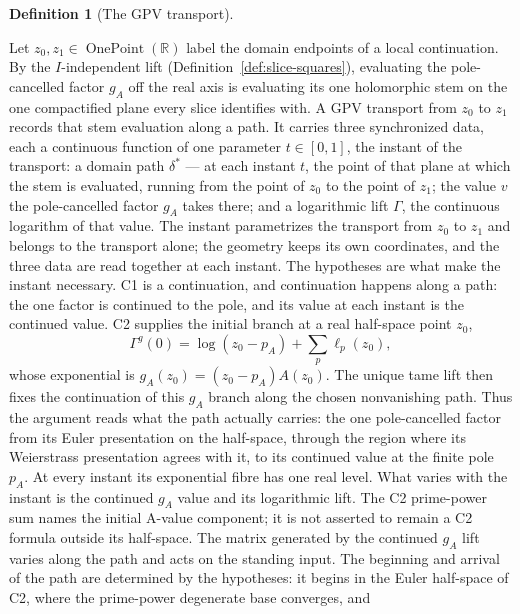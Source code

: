 \documentclass[11pt]{article}
\newcommand{\RR}{\mathbb{R}}
\providecommand{\lean}[1]{}
\providecommand{\uses}[1]{}
\theoremstyle{plain}
\theoremstyle{definition}
\newtheorem{definition}[theorem]{Definition}
\theoremstyle{remark}
\begin{document}
\begin{definition}[The GPV transport]\label{def:gpv-transport}
\lean{ASection.GpvTransport, ASection.GpvCircuit,
ASection.GpvCircuit.ofEulerHalfSpaceLoop, ASection.pole_re_le_Ω₀,
ASection.exists_euler_to_pole_with_initial}
\uses{thm:winding-lift, prop:winding-signature, def:A-section}
Let $z_0,z_1\in\operatorname{OnePoint}(\RR)$ label the domain endpoints
of a local continuation. By the $I$-independent lift
(Definition~\ref{def:slice-squares}), evaluating the pole-cancelled factor
$g_A$ off the real axis is evaluating its one holomorphic stem on the one
compactified plane every slice identifies with. A GPV transport
from $z_0$ to $z_1$ records that stem evaluation along a path. It carries
three synchronized data, each a continuous function of one parameter
$t\in[0,1]$, the instant of the transport: a domain path $\delta^*$ ---
at each instant $t$, the point of that plane at which the stem is
evaluated, running from the point of $z_0$ to the point of $z_1$; the value
$v$ the pole-cancelled factor $g_A$ takes there; and a logarithmic lift $\Gamma$, the
continuous logarithm of that value.
The instant parametrizes the transport from $z_0$ to $z_1$ and belongs to the transport alone; the
geometry keeps its own coordinates, and the three data are read together at each instant.
The hypotheses are what make the instant necessary. C1 is a continuation, and continuation
happens along a path: the one factor is continued to the pole, and its value at
each instant is the continued value. C2 supplies the initial branch at a real
half-space point $z_0$,
\[
  \Gamma^g(0)=\log(z_0-p_A)+\sum_p\ell_p(z_0),
\]
whose exponential is $g_A(z_0)=(z_0-p_A)A(z_0)$. The unique tame lift then fixes
the continuation of this $g_A$ branch along the chosen nonvanishing path.
Thus the argument reads what the path actually carries: the one
pole-cancelled factor from its Euler presentation on the half-space, through
the region where its Weierstrass presentation agrees with it, to its
continued value at the finite pole $p_A$. At every instant its exponential
fibre has one real level. What varies with the instant is the continued
$g_A$ value and its logarithmic lift. The C2 prime-power sum names the
initial A-value component; it is not asserted to remain a C2 formula outside
its half-space. The matrix generated by the continued $g_A$ lift varies
along the path and acts on the standing input. The beginning and arrival of
the path are determined by the hypotheses: it
begins in the Euler half-space of C2, where the prime-power degenerate base converges, and

\end{definition}
\end{document}
